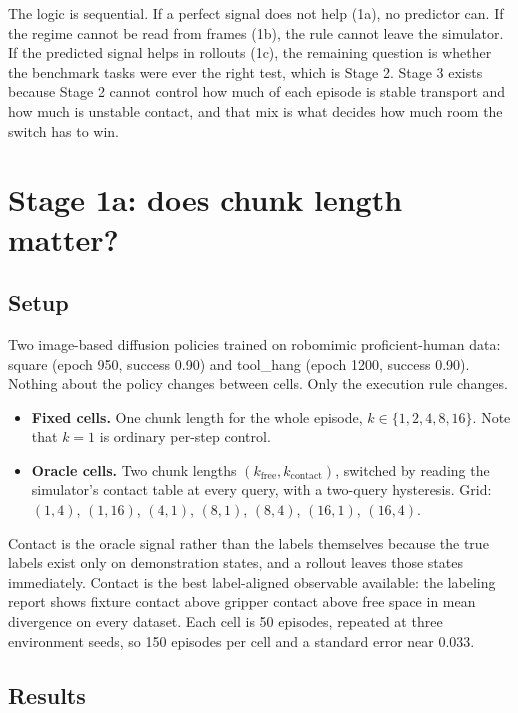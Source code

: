 \documentclass[11pt]{article}
\begin{document}
The logic is sequential. If a perfect signal does not help (1a), no predictor
can. If the regime cannot be read from frames (1b), the rule cannot leave the
simulator. If the predicted signal helps in rollouts (1c), the remaining
question is whether the benchmark tasks were ever the right test, which is
Stage 2. Stage 3 exists because Stage 2 cannot control how much of each
episode is stable transport and how much is unstable contact, and that mix is
what decides how much room the switch has to win.

\section{Stage 1a: does chunk length matter?}

\subsection{Setup}

Two image-based diffusion policies trained on robomimic proficient-human
data: square (epoch 950, success 0.90) and tool\_hang (epoch 1200, success
0.90). Nothing about the policy changes between cells. Only the execution
rule changes.

\begin{itemize}[leftmargin=1.4em]
\item \textbf{Fixed cells.} One chunk length for the whole episode,
$k \in \{1, 2, 4, 8, 16\}$. Note that $k{=}1$ is ordinary per-step control.
\item \textbf{Oracle cells.} Two chunk lengths
$(k_{\mathrm{free}}, k_{\mathrm{contact}})$, switched by reading the
simulator's contact table at every query, with a two-query hysteresis. Grid:
$(1,4)$, $(1,16)$, $(4,1)$, $(8,1)$, $(8,4)$, $(16,1)$, $(16,4)$.
\end{itemize}

Contact is the oracle signal rather than the labels themselves because the
true labels exist only on demonstration states, and a rollout leaves those
states immediately. Contact is the best label-aligned observable available:
the labeling report shows fixture contact above gripper contact above free
space in mean divergence on every dataset. Each cell is 50 episodes, repeated
at three environment seeds, so 150 episodes per cell and a standard error near
0.033.

\subsection{Results}
\end{document}
